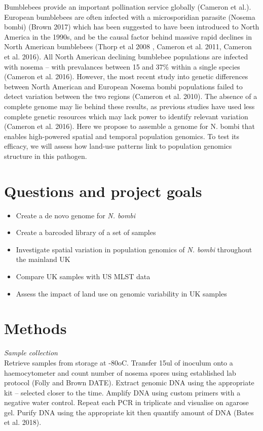 \documentclass[11pt]{article}
\begin{document}
	Bumblebees provide an important pollination service globally (Cameron et al.). European bumblebees are often infected with a microsporidian parasite (Nosema bombi) (Brown 2017) which has been suggested to have been introduced to North America in the 1990s, and be the causal factor behind massive rapid declines in North American bumblebees (Thorp et al 2008 , Cameron et al. 2011, Cameron  et al. 2016). All North American declining bumblebee populations are infected with nosema – with prevalances between 15 and 37\% within a single species (Cameron  et al. 2016). However, the most recent study into genetic differences between North American and European Nosema bombi populations failed to detect variation between the two regions (Cameron et al. 2010). The absence of a complete genome may lie behind these results, as previous studies have used less complete genetic resources which may lack power to identify relevant variation (Cameron et al. 2016). Here we propose to assemble a genome for N. bombi that enables high-powered spatial and temporal population genomics. To test its efficacy, we will assess how land-use patterns link to population genomics structure in this pathogen.	
	
	\section{Questions and project goals}
	
	\begin{itemize}
		\item Create a de novo genome for \textit{N. bombi}
		\item Create a barcoded library of a set of samples
		\item Investigate spatial variation in population genomics of \textit{N. bombi} throughout the mainland UK
		\item Compare UK samples with US MLST data
		\item Assess the impact of land use on genomic variability in UK samples
	\end{itemize}
	
	\section{Methods}
	
		\item \textit{Sample collection} \\
		
		Retrieve samples from storage at -80oC. Transfer 15ul of inoculum onto a haemocytometer and count number of nosema spores using established lab protocol (Folly and Brown DATE). Extract genomic DNA using the appropriate kit – selected closer to the time. Amplify DNA using custom primers with a negative water control. Repeat each PCR in triplicate and visualise on agarose gel. Purify DNA using the appropriate kit then quantify amount of DNA (Bates et al. 2018).
		
\end{document}
